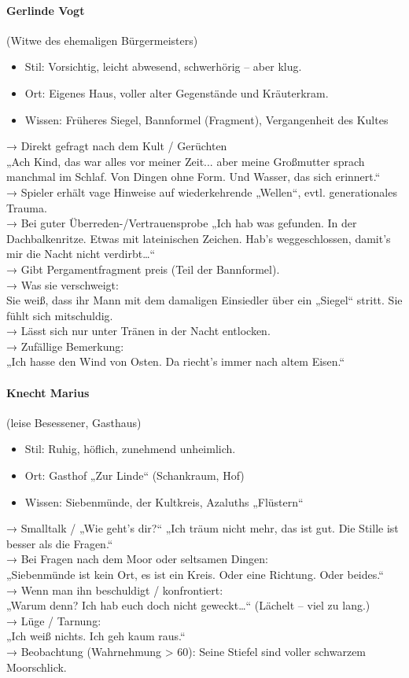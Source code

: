 \paragraph{Gerlinde Vogt} (Witwe des ehemaligen Bürgermeisters)
\begin{itemize}
\item Stil: Vorsichtig, leicht abwesend, schwerhörig – aber klug.
\item Ort: Eigenes Haus, voller alter Gegenstände und Kräuterkram.
\item Wissen: Früheres Siegel, Bannformel (Fragment), Vergangenheit des Kultes
\end{itemize}
→ Direkt gefragt nach dem Kult / Gerüchten\\
„Ach Kind, das war alles vor meiner Zeit... aber meine Großmutter sprach manchmal im Schlaf. Von Dingen ohne Form. Und Wasser, das sich erinnert.“\\
→ Spieler erhält vage Hinweise auf wiederkehrende „Wellen“, evtl. generationales Trauma.\\
→ Bei guter Überreden-/Vertrauensprobe
„Ich hab was gefunden. In der Dachbalkenritze. Etwas mit lateinischen Zeichen. Hab’s weggeschlossen, damit’s mir die Nacht nicht verdirbt…“\\
→ Gibt Pergamentfragment preis (Teil der Bannformel).\\
→ Was sie verschweigt:\\
Sie weiß, dass ihr Mann mit dem damaligen Einsiedler über ein „Siegel“ stritt. Sie fühlt sich mitschuldig.\\
→ Lässt sich nur unter Tränen in der Nacht entlocken.\\
→ Zufällige Bemerkung:\\
„Ich hasse den Wind von Osten. Da riecht’s immer nach altem Eisen.“
\paragraph{Knecht Marius} (leise Besessener, Gasthaus)
\begin{itemize}
\item Stil: Ruhig, höflich, zunehmend unheimlich.
\item Ort: Gasthof „Zur Linde“ (Schankraum, Hof)
\item Wissen: Siebenmünde, der Kultkreis, Azaluths „Flüstern“
\end{itemize}
→ Smalltalk / „Wie geht’s dir?“
„Ich träum nicht mehr, das ist gut. Die Stille ist besser als die Fragen.“\\
→ Bei Fragen nach dem Moor oder seltsamen Dingen:\\
„Siebenmünde ist kein Ort, es ist ein Kreis. Oder eine Richtung. Oder beides.“\\
→ Wenn man ihn beschuldigt / konfrontiert:\\
„Warum denn? Ich hab euch doch nicht geweckt…“ (Lächelt – viel zu lang.)\\
→ Lüge / Tarnung:\\
„Ich weiß nichts. Ich geh kaum raus.“\\
→ Beobachtung (Wahrnehmung > 60): Seine Stiefel sind voller schwarzem Moorschlick.
